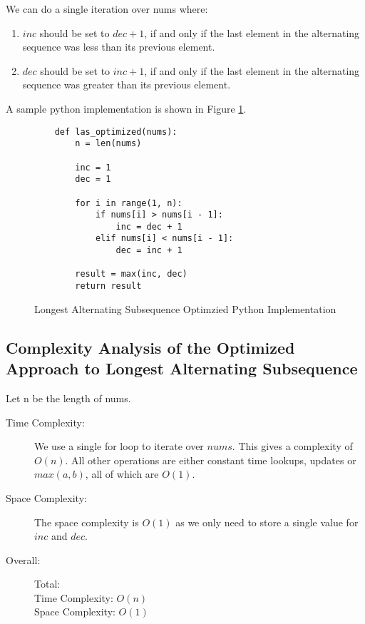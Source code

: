 We can do a single iteration over nums where:

\begin{enumerate}
    \item $inc$ should be set to $dec + 1$, if and only if the last element in the alternating sequence was less than its previous element.
    
    \item $dec$ should be set to $inc + 1$, if and only if the last element in the alternating sequence was greater than its previous element.

\end{enumerate}

A sample python implementation is shown in Figure \ref{fig:las-optimized}.

\begin{figure}[H]
    \centering
    \begin{lstlisting}
    def las_optimized(nums):
        n = len(nums)
    
        inc = 1
        dec = 1
    
        for i in range(1, n):
            if nums[i] > nums[i - 1]:
                inc = dec + 1
            elif nums[i] < nums[i - 1]:
                dec = inc + 1
    
        result = max(inc, dec)
        return result
    \end{lstlisting}
    \caption{Longest Alternating Subsequence Optimzied Python Implementation}
    \label{fig:las-optimized}
\end{figure}

\subsection{Complexity Analysis of the Optimized Approach to Longest Alternating Subsequence}
Let n be the length of nums.

\begin{description}
    \item[Time Complexity:]
        We use a single for loop to iterate over $nums$.
        This gives a complexity of $O(n)$.
        All other operations are either constant time lookups,
        updates or $max(a,b)$, all of which are $O(1)$.
        
    \item[Space Complexity:] 
        The space complexity is $O(1)$ as we only need to store a single value for $inc$ and $dec$.

    \item[Overall:] Total:\\
        Time Complexity: $O(n)$\\
        Space Complexity: $O(1)$
    
\end{description}

\newpage